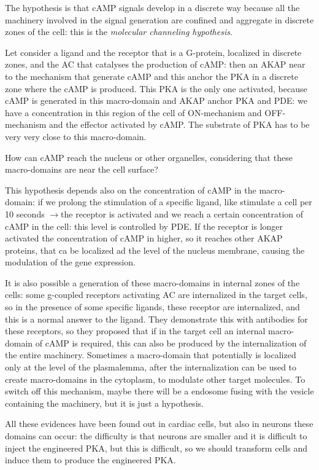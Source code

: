 \documentclass[a4paper, 12pt]{book}
\newcommand{\lfreccia}{\ensuremath{\longrightarrow}}
\begin{document}
The hypothesis is that cAMP signals develop in a discrete way because all the machinery involved in the signal generation are confined and aggregate in discrete zones of the cell: this is the \emph{molecular channeling hypothesis}. 

Let consider a ligand and the receptor that is a G-protein, localized in discrete zones, and the AC that catalyses the production of cAMP: then an AKAP near to the mechanism that generate cAMP and this anchor the PKA in a discrete zone where the cAMP is produced. This PKA is the only one activated, because cAMP is generated in this macro-domain and AKAP anchor PKA and PDE: we have a concentration in this region of the cell of ON-mechanism and OFF-mechanism and the effector activated by cAMP. The substrate of PKA has to be very very close to this macro-domain.

How can cAMP reach the nucleus or other organelles, considering that these macro-domains are near the cell surface?

This hypothesis depends also on the concentration of cAMP in the macro-domain: if we prolong the stimulation of a specific ligand, like stimulate a cell per 10 seconds \lfreccia the receptor is activated and we reach a certain concentration of cAMP in the cell: this level is controlled by PDE. If the receptor is longer activated the concentration of cAMP in higher, so it reaches other AKAP proteins, that ca be localized ad the level of the nucleus membrane, causing the modulation of the gene expression.


It is also possible a generation of these macro-domains in internal zones of the cells: some g-coupled receptors activating AC are internalized in the target cells, so in the presence of some specific ligands, these receptor are internalized, and this is a normal answer to the ligand. They demonstrate this with antibodies for these receptors, so they proposed that if in the target cell an internal macro-domain of cAMP is required, this can also be produced by the internalization of the entire machinery. Sometimes a macro-domain that potentially is localized only at the level of the plasmalemma, after the internalization can be used to create macro-domains in the cytoplasm, to modulate other target molecules. To switch off this mechanism, maybe there will be a endosome fusing with the vesicle containing the machinery, but it is just a hypothesis.

All these evidences have been found out in cardiac cells, but also in neurons these domains can occur: the difficulty is that neurons are smaller and it is difficult to inject the engineered PKA, but this is difficult, so we should transform cells and induce them  to produce the engineered PKA.
\end{document}
